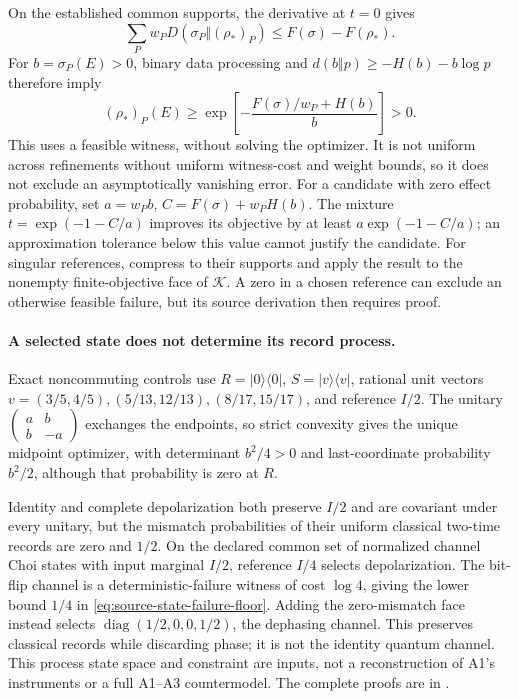 On the established common supports, the derivative at $t=0$ gives
\[
 \sum_P w_P D(\sigma_P\Vert(\rho_*)_P)
       \leq F(\sigma)-F(\rho_*).
\]
For $b=\sigma_P(E)>0$, binary data processing and
$d(b\Vert p)\geq-H(b)-b\log p$ therefore imply
\begin{equation}
 (\rho_*)_P(E)\geq
 \exp\!\left[-\frac{F(\sigma)/w_P+H(b)}{b}\right]>0.
 \label{eq:source-state-failure-floor}
\end{equation}
This uses a feasible witness, without solving the optimizer. It is not
uniform across refinements without uniform witness-cost and weight bounds,
so it does not exclude an asymptotically vanishing error. For a candidate
with zero effect probability, set $a=w_Pb$, $C=F(\sigma)+w_PH(b)$.
The mixture $t=\exp(-1-C/a)$ improves its objective by at least
$a\exp(-1-C/a)$; an approximation tolerance below this value cannot
justify the candidate. For singular references, compress to their
supports and apply the result to the nonempty finite-objective face of
$\mathcal K$. A zero in a chosen reference can exclude an otherwise
feasible failure, but its source derivation then requires proof.

\paragraph{A selected state does not determine its record process.}
Exact noncommuting controls use $R=|0\rangle\langle0|$,
$S=|v\rangle\langle v|$, rational unit vectors
$v=(3/5,4/5),(5/13,12/13),(8/17,15/17)$, and reference $I/2$.
The unitary $\left(\begin{smallmatrix}a&b\\b&-a\end{smallmatrix}\right)$
exchanges the endpoints, so strict convexity gives the unique midpoint
optimizer, with determinant $b^2/4>0$ and last-coordinate probability
$b^2/2$, although that probability is zero at $R$.

Identity and complete depolarization both preserve $I/2$ and are
covariant under every unitary, but the mismatch probabilities of their
uniform classical two-time records are zero and $1/2$. On the declared
common set of normalized channel Choi states with input marginal $I/2$,
reference $I/4$ selects depolarization. The bit-flip channel is a
deterministic-failure witness of cost $\log4$, giving the lower bound
$1/4$ in \eqref{eq:source-state-failure-floor}. Adding the zero-mismatch
face instead selects $\operatorname{diag}(1/2,0,0,1/2)$, the dephasing
channel. This preserves classical records while discarding phase; it is
not the identity quantum channel. This process state space and constraint
are inputs, not a reconstruction of A1's instruments or a full A1--A3
countermodel. The complete proofs are in
.

